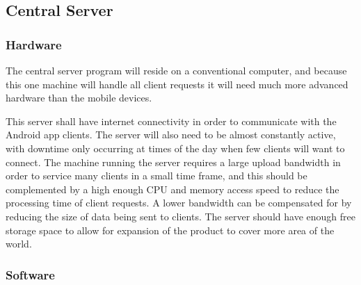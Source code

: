	\subsection{Central Server}
		\subsubsection{Hardware}
			The central server program will reside on a conventional computer, and because this one machine will handle all client requests it will need much more advanced hardware than the mobile devices.

			This server shall have internet connectivity in order to communicate with the Android app clients. The server will also need to be almost constantly active, with downtime only occurring at times of the day when few clients will want to connect. The machine running the server requires a large upload bandwidth in order to service many clients in a small time frame, and this should be complemented by a high enough CPU and memory access speed to reduce the processing time of client requests. A lower bandwidth can be compensated for by reducing the size of data being sent to clients. The server should have enough free storage space to allow for expansion of the product to cover more area of the world.
		\subsubsection{Software}

